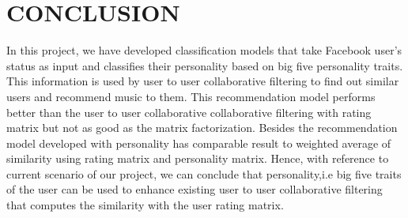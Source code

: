 \newpage
\section{CONCLUSION}
In this project, we have developed classification models that take Facebook user's status as input and classifies their personality based on big five personality traits. This information is used by user to user collaborative filtering to find out similar users and recommend music to them. This recommendation model performs better than the user to user collaborative collaborative filtering with rating matrix but not as good as the matrix factorization. Besides the recommendation model developed with personality has comparable result to weighted average of similarity using rating matrix and personality matrix. Hence, with reference to current scenario of our project, we can conclude that personality,i.e big five traits of the user can be used to enhance existing user to user collaborative filtering that computes the similarity with the user rating matrix.
